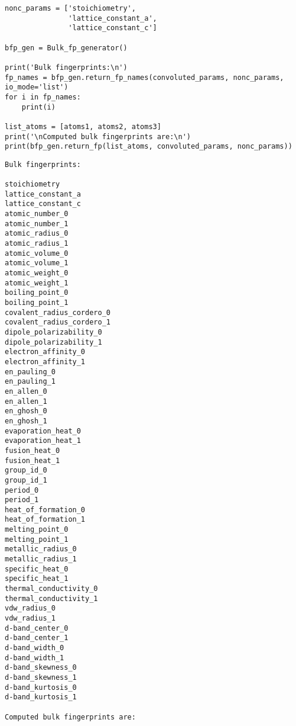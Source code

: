 \documentclass[11pt]{article}
\begin{document}
\begin{verbatim}
nonc_params = ['stoichiometry', 
               'lattice_constant_a',                                       
               'lattice_constant_c']                                       

bfp_gen = Bulk_fp_generator()

print('Bulk fingerprints:\n')
fp_names = bfp_gen.return_fp_names(convoluted_params, nonc_params, io_mode='list')
for i in fp_names:
    print(i)

list_atoms = [atoms1, atoms2, atoms3]
print('\nComputed bulk fingerprints are:\n')
print(bfp_gen.return_fp(list_atoms, convoluted_params, nonc_params))

\end{verbatim}

\begin{verbatim}
Bulk fingerprints:

stoichiometry
lattice_constant_a
lattice_constant_c
atomic_number_0
atomic_number_1
atomic_radius_0
atomic_radius_1
atomic_volume_0
atomic_volume_1
atomic_weight_0
atomic_weight_1
boiling_point_0
boiling_point_1
covalent_radius_cordero_0
covalent_radius_cordero_1
dipole_polarizability_0
dipole_polarizability_1
electron_affinity_0
electron_affinity_1
en_pauling_0
en_pauling_1
en_allen_0
en_allen_1
en_ghosh_0
en_ghosh_1
evaporation_heat_0
evaporation_heat_1
fusion_heat_0
fusion_heat_1
group_id_0
group_id_1
period_0
period_1
heat_of_formation_0
heat_of_formation_1
melting_point_0
melting_point_1
metallic_radius_0
metallic_radius_1
specific_heat_0
specific_heat_1
thermal_conductivity_0
thermal_conductivity_1
vdw_radius_0
vdw_radius_1
d-band_center_0
d-band_center_1
d-band_width_0
d-band_width_1
d-band_skewness_0
d-band_skewness_1
d-band_kurtosis_0
d-band_kurtosis_1

Computed bulk fingerprints are:


\end{verbatim}
\end{document}

